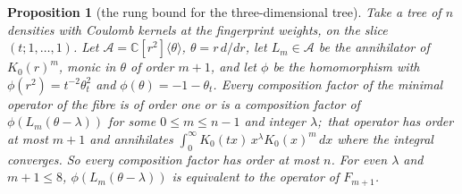 \documentclass[aps,pra,twocolumn,superscriptaddress,longbibliography]{revtex4-2}
\newtheorem{proposition}{Proposition}
\begin{document}
\begin{proposition}[the rung bound for the three-dimensional tree]
\label{prop:tree_rung}
Take a tree of $n$ densities with Coulomb kernels at the fingerprint weights,
on the slice $(t;1,\dots,1)$.  Let $\mathcal{A}=\mathbb{C}[r^2]\langle\theta\rangle$,
$\theta=r\,d/dr$, let $L_m\in\mathcal{A}$ be the annihilator of $K_0(r)^m$,
monic in $\theta$ of order $m+1$, and let $\phi$ be the homomorphism with
$\phi(r^2)=t^{-2}\theta_t^2$ and $\phi(\theta)=-1-\theta_t$.  Every
composition factor of the minimal operator of the fibre is of order one or
is a composition factor of $\phi(L_m(\theta-\lambda))$ for some $0\le m\le
n-1$ and integer $\lambda$;\ that operator has order at most $m+1$ and
annihilates $\int_0^\infty K_0(tx)\,x^{\lambda}K_0(x)^m\,dx$ where the integral
converges.  So every composition factor has order at most $n$.  For even
$\lambda$ and $m+1\le8$, $\phi(L_m(\theta-\lambda))$ is equivalent to the
operator of $F_{m+1}$.
\end{proposition}
\end{document}
